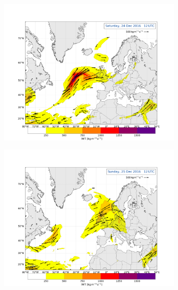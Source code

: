 \begin{figure}[t!]\ContinuedFloat
	\begin{subfigure}[b]{0.49\textwidth}
		\includegraphics[trim={4.2cm 3.9cm 4.3cm 5.1cm},clip,
		width=\textwidth]{./fig_Atm_Riv/20161224_12}
		\caption{}\label{fig:AR24}
	\end{subfigure}
	\begin{subfigure}[b]{0.49\textwidth}
		\includegraphics[trim={4.2cm 3.9cm 4.3cm 5.1cm},clip,
		width=\textwidth]{./fig_Atm_Riv/20161225_12}
		\caption{}\label{fig:AR25}
	\end{subfigure}

\end{figure}
